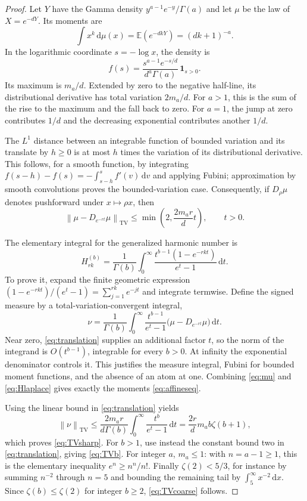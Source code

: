 \documentclass[11pt,letterpaper]{article}
\numberwithin{equation}{section}
\theoremstyle{definition}
\DeclareMathOperator{\TV}{TV}
\newcommand{\dd}{\,\mathrm d}
\newcommand{\norm}[1]{\left\lVert#1\right\rVert}
\begin{document}
\begin{proof}
Let $Y$ have the Gamma density $y^{a-1}e^{-y}/\Gamma(a)$ and let
$\mu$ be the law of $X=e^{-dY}$. Its moments are
\begin{equation}
 \int x^k\dd\mu(x)=\mathbb E(e^{-dkY})=(dk+1)^{-a}.
 \label{eq:mu}
\end{equation}
In the logarithmic coordinate $s=-\log x$, the density is
\[
 f(s)=\frac{s^{a-1}e^{-s/d}}{d^a\Gamma(a)}\,\mathbf 1_{s>0}.
\]
Its maximum is $m_a/d$. Extended by zero to the negative half-line,
its distributional derivative has total variation $2m_a/d$.
For $a>1$, this is the sum of the rise to the maximum and the fall
back to zero. For $a=1$, the jump at zero contributes $1/d$ and
the decreasing exponential contributes another $1/d$.

The $L^1$ distance between an integrable function of bounded variation
and its translate by $h\ge0$ is at most $h$ times the variation of its
distributional derivative. This follows, for a smooth function, by
integrating $f(s-h)-f(s)=-\int_{s-h}^s f'(v)\dd v$ and applying
Fubini; approximation by smooth convolutions proves the bounded-variation
case. Consequently, if $D_\rho\mu$ denotes pushforward under
$x\mapsto\rho x$, then
\begin{equation}
 \norm{\mu-D_{e^{-rt}}\mu}_{\TV}
 \le\min\left(2,\frac{2m_ar}{d}t\right),\qquad t>0.
 \label{eq:translation}
\end{equation}

The elementary integral for the generalized harmonic number is
\begin{equation}
 H_{rk}^{(b)}=\frac1{\Gamma(b)}\int_0^\infty
       \frac{t^{b-1}(1-e^{-rkt})}{e^t-1}\dd t.
 \label{eq:Hlaplace}
\end{equation}
To prove it, expand the finite geometric expression
$(1-e^{-rkt})/(e^t-1)=\sum_{j=1}^{rk}e^{-jt}$ and integrate termwise.
Define the signed measure by a total-variation-convergent integral,
\begin{equation}
 \nu=\frac1{\Gamma(b)}\int_0^\infty
       \frac{t^{b-1}}{e^t-1}
       \bigl(\mu-D_{e^{-rt}}\mu\bigr)\dd t.
 \label{eq:nu}
\end{equation}
Near zero, \eqref{eq:translation} supplies an additional factor $t$,
so the norm of the integrand is $O(t^{b-1})$, integrable for every
$b>0$. At infinity the exponential denominator controls it. This
justifies the measure integral, Fubini for bounded moment functions,
and the absence of an atom at one. Combining \eqref{eq:mu} and
\eqref{eq:Hlaplace} gives exactly the moments \eqref{eq:affineseq}.

Using the linear bound in \eqref{eq:translation} yields
\[
 \norm\nu_{\TV}\le
 \frac{2m_ar}{d\Gamma(b)}\int_0^\infty\frac{t^b}{e^t-1}\dd t
 =\frac{2r}{d}m_ab\zeta(b+1),
\]
which proves \eqref{eq:TVsharp}. For $b>1$, use instead the constant
bound two in \eqref{eq:translation}, giving \eqref{eq:TVb}.
For integer $a$, $m_a\le1$: with $n=a-1\ge1$, this is the elementary
inequality $e^n\ge n^n/n!$. Finally $\zeta(2)<5/3$, for instance by
summing $n^{-2}$ through $n=5$ and bounding the remaining tail by
$\int_5^\infty x^{-2}\dd x$. Since $\zeta(b)\le\zeta(2)$ for
integer $b\ge2$, \eqref{eq:TVcoarse} follows.
\end{proof}
\end{document}
